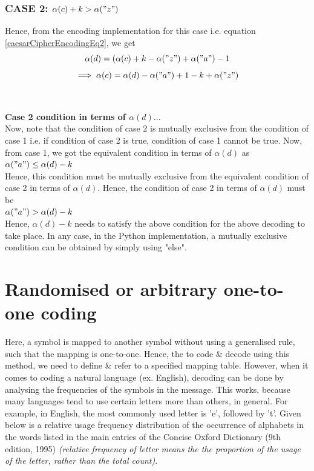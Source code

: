 \subsubsection{CASE 2: $\alpha(c)+k > \alpha("z")$}
Hence, from the encoding implementation for this case i.e. equation \ref{caesarCipherEncodingEq2}, we get
\[\alpha(d) = (\alpha(c)+k - \alpha("z") + \alpha("a") - 1\]
\begin{equation} \implies \alpha(c) = \alpha(d) - \alpha("a") + 1 - k + \alpha("z") \end{equation}
\\~\\
\textbf{Case 2 condition in terms of $\alpha(d)$}...\\
Now, note that the condition of case 2 is mutually exclusive from the condition of case 1 i.e. if condition of case 2 is true, condition of case 1 cannot be true. Now, from case 1, we got the equivalent condition in terms of $\alpha(d)$ as\\
$\alpha("a") \leq \alpha(d) - k$\\
Hence, this condition must be mutually exclusive from the equivalent condition of case 2 in terms of $\alpha(d)$. Hence, the condition of case 2 in terms of $\alpha(d)$ must be\\
$\alpha("a") > \alpha(d) - k$\\
Hence, $\alpha(d) - k$ needs to satisfy the above condition for the above decoding to take place. In any case, in the Python implementation, a mutually exclusive condition can be obtained by simply using "else".



\section{Randomised or arbitrary one-to-one coding}
Here, a symbol is mapped to another symbol without using a generalised rule, such that the mapping is one-to-one. Hence, the to code \& decode using this method, we need to define \& refer to a specified mapping table. However, when it comes to coding a natural language (ex. English), decoding can be done by analysing the frequencies of the symbols in the message. This works, because many languages tend to use certain letters more than others, in general. For example, in English, the most commonly used letter is 'e', followed by 't'. Given below is a relative usage frequency distribution of the occurrence of alphabets in the words listed in the main entries of the Concise Oxford Dictionary  (9th edition, 1995) \textit{(relative frequency of letter means the the proportion of the usage of the letter, rather than the total count)}.

